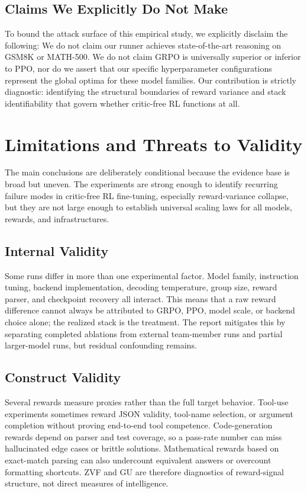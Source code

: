 \documentclass[12pt,a4paper]{report}
\begin{document}
\section*{Claims We Explicitly Do Not Make}
To bound the attack surface of this empirical study, we explicitly disclaim the following: We do not claim our runner achieves state-of-the-art reasoning on GSM8K or MATH-500. We do not claim GRPO is universally superior or inferior to PPO, nor do we assert that our specific hyperparameter configurations represent the global optima for these model families. Our contribution is strictly diagnostic: identifying the structural boundaries of reward variance and stack identifiability that govern whether critic-free RL functions at all.

\chapter{Limitations and Threats to Validity}
\label{ch:limitations}

The main conclusions are deliberately conditional because the evidence base is broad but uneven. The experiments are strong enough to identify recurring failure modes in critic-free RL fine-tuning, especially reward-variance collapse, but they are not large enough to establish universal scaling laws for all models, rewards, and infrastructures.

\section*{Internal Validity}
Some runs differ in more than one experimental factor. Model family, instruction tuning, backend implementation, decoding temperature, group size, reward parser, and checkpoint recovery all interact. This means that a raw reward difference cannot always be attributed to GRPO, PPO, model scale, or backend choice alone; the realized stack is the treatment. The report mitigates this by separating completed ablations from external team-member runs and partial larger-model runs, but residual confounding remains.

\section*{Construct Validity}
Several rewards measure proxies rather than the full target behavior. Tool-use experiments sometimes reward JSON validity, tool-name selection, or argument completion without proving end-to-end tool competence. Code-generation rewards depend on parser and test coverage, so a pass-rate number can miss hallucinated edge cases or brittle solutions. Mathematical rewards based on exact-match parsing can also undercount equivalent answers or overcount formatting shortcuts. ZVF and GU are therefore diagnostics of reward-signal structure, not direct measures of intelligence.
\end{document}
